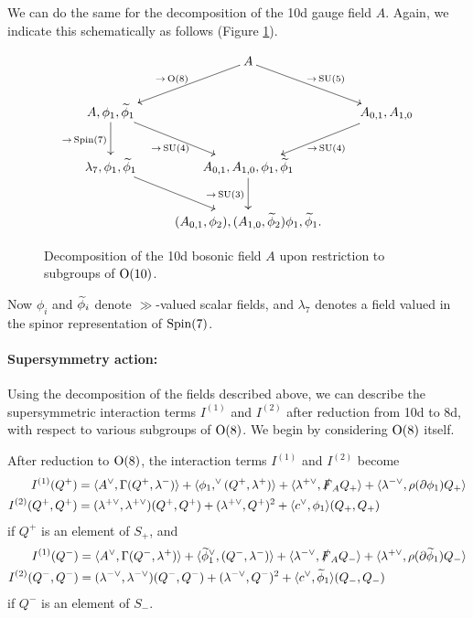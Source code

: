 \documentclass[10pt, oneside]{article}
\begin{document}
We can do the same for the decomposition of the 10d gauge field $A$.  Again, we indicate this schematically as follows (Figure \ref{fig:8dbosondecomp}).
\begin{figure}[!h]
\[\xymatrix{
&A \ar[dl]_{\to\,  \mr{O}(8)} \ar[dr]^{\to\,  \SU(5)} & \\
A,\phi_1, \wt \phi_1 \ar[dr]_{\to\,  \SU(4)} \ar[d]_{\to\,  \Spin(7)} &&A_{0,1}, A_{1,0} \ar[dl]^{\to\,  \SU(4)} \\
\lambda_7, \phi_1, \wt \phi_1 \ar[dr] &A_{0,1},A_{1,0},\phi_1, \wt \phi_1 \ar[d]_{\to\,  \SU(3)} & \\
&(A_{0,1}, \phi_2) ,(A_{1,0}, \wt \phi_2) \phi_1, \wt \phi_1.&
}
\]
\caption{Decomposition of the 10d bosonic field $A$ upon restriction to subgroups of $\mathrm{O}(10)$.}
\label{fig:8dbosondecomp}
\end{figure}
Now $\phi_i$ and $\widetilde{\phi}_i$ denote $\gg$-valued scalar fields, and $\lambda_7$ denotes a field valued in the spinor representation of $\mathrm{Spin}(7)$.

\vspace{-10pt}
\paragraph{Supersymmetry action:} 
Using the decomposition of the fields described above, we can describe the supersymmetric interaction terms $I^{(1)}$ and $I^{(2)}$ after reduction from 10d to 8d, with respect to various subgroups of $\mathrm{O}(8)$.  We begin by considering $\mathrm{O}(8)$ itself.

\begin{prop} \label{O8_decomposition_of_susy_prop}
After reduction to $\mathrm{O}(8)$, the interaction terms $I^{(1)}$ and $I^{(2)}$ become
\begin{align*}
I^{(1)}(Q^+) &= \langle A^\vee, \Gamma(Q^+, \lambda^-)\rangle + \langle \phi_1,^\vee (Q^+,\lambda^+)\rangle + \langle \lambda^{+\vee}, \slashed{F}_A Q_+ \rangle + \langle \lambda^{-\vee}, \rho(\partial \phi_1)Q_+ \rangle\\
I^{(2)}(Q^+, Q^+) &= (\lambda^{+\vee}, \lambda^{+\vee})(Q^+,Q^+) + (\lambda^{+\vee},Q^+)^2 + \langle c^\vee, \phi_1\rangle(Q_+,Q_+)
\end{align*}
if $Q^+$ is an element of $S_+$, and
\begin{align*}
I^{(1)}(Q^-) &= \langle A^\vee, \Gamma(Q^-, \lambda^+)\rangle + \langle \widetilde{\phi}_1^\vee, (Q^-,\lambda^-)\rangle+ \langle \lambda^{-\vee}, \slashed{F}_A Q_- \rangle + \langle \lambda^{+\vee}, \rho(\partial \widetilde{\phi}_1)Q_- \rangle\\
I^{(2)}(Q^-, Q^-) &= (\lambda^{-\vee}, \lambda^{-\vee})(Q^-,Q^-) + (\lambda^{-\vee},Q^-)^2 + \langle c^\vee, \widetilde{\phi}_1\rangle(Q_-,Q_-)
\end{align*}
if $Q^-$ is an element of $S_-$.
\end{prop}
\end{document}
